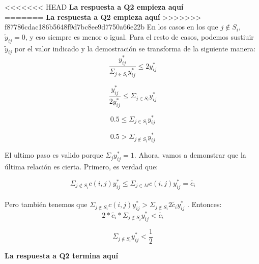 <<<<<<< HEAD
\textbf{La respuesta a Q2 empieza aquí} 
\\
=======
\textbf{La respuesta a Q2 empieza aquí}
>>>>>>> f87786cdac186b5648f9d7bc8ee9d7750a66e22b
En los casos en los que $j \notin S_i$, $\tilde{y}_{ij} = 0$, y eso siempre es menor o igual.
Para el resto de casos, podemos sustiuir $\tilde{y}_{ij}$ por el valor indicado y la demostración se transforma de la siguiente manera:
\begin{equation}
 \frac{y^*_{ij}}{\Sigma_{j \in S_i} y^*_{ij}} \leq 2y^*_{ij}
\end{equation}

\begin{equation}
 \frac{y^*_{ij}}{2y^*_{ij}} \leq \Sigma_{j \in S_i} y^*_{ij}
\end{equation}

\begin{equation}
 0.5 \leq \Sigma_{j \in S_i} y^*_{ij}
\end{equation}

\begin{equation}
 0.5 > \Sigma_{j \notin S_i} y^*_{ij}
\end{equation}

El ultimo paso es valido porque $\Sigma_{j} y^*_{ij} = 1$. Ahora, vamos a demonstrar que la última relación es cierta. Primero, es verdad que:

\begin{equation}
 \Sigma_{j \notin S_i} c(i,j) y^*_{ij} \leq \Sigma_{j \in M} c(i,j) y^*_{ij} = \tilde{c_i}
\end{equation}
\\
Pero también tenemos que $\Sigma_{j \notin S_i} c(i,j) y^*_{ij} > \Sigma_{j \notin S_i} 2 \tilde{c_i} y^*_{ij}$ . Entonces:
\\
\begin{equation}
 2* \tilde{c_i} * \Sigma_{j \notin S_i} y^*_{ij}  < \tilde{c_i}
\end{equation}

\begin{equation}
 \Sigma_{j \notin S_i} y^*_{ij} < \frac{1}{2}
\end{equation}

\textbf{La respuesta a Q2 termina aquí}

